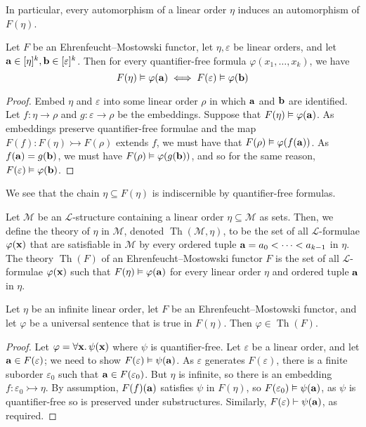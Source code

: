In particular, every automorphism of a linear order \( \eta \) induces an automorphism of \( F(\eta) \).
\begin{proposition}
	Let \( F \) be an Ehrenfeucht--Mostowski functor, let \( \eta, \varepsilon \) be linear orders, and let \( \vb a \in [\eta]^k, \vb b \in [\varepsilon]^k \).
	Then for every quantifier-free formula \( \varphi(x_1, \dots, x_k) \), we have
	\[ F(\eta) \vDash \varphi(\vb a) \iff F(\varepsilon) \vDash \varphi(\vb b) \]
\end{proposition}
\begin{proof}
	Embed \( \eta \) and \( \varepsilon \) into some linear order \( \rho \) in which \( \vb a \) and \( \vb b \) are identified.
	Let \( f : \eta \to \rho \) and \( g : \varepsilon \to \rho \) be the embeddings.
	Suppose that \( F(\eta) \vDash \varphi(\vb a) \).
	As embeddings preserve quantifier-free formulae and the map \( F(f) : F(\eta) \rightarrowtail F(\rho) \) extends \( f \), we must have that \( F(\rho) \vDash \varphi(f(\vb a)) \).
	As \( f(\vb a) = g(\vb b) \), we must have \( F(\rho) \vDash \varphi(g(\vb b)) \), and so for the same reason, \( F(\varepsilon) \vDash \varphi(\vb b) \).
\end{proof}
We see that the chain \( \eta \subseteq F(\eta) \) is indiscernible by quantifier-free formulas.
\begin{definition}
	Let \( \mathcal M \) be an \( \mathcal L \)-structure containing a linear order \( \eta \subseteq \mathcal M \) as sets.
	Then, we define the theory of \( \eta \) in \( \mathcal M \), denoted \( \operatorname{Th}(\mathcal M, \eta) \), to be the set of all \( \mathcal L \)-formulae \( \varphi(\vb x) \) that are satisfiable in \( \mathcal M \) by every ordered tuple \( \vb a = a_0 < \dots < a_{k-1} \) in \( \eta \).
	The theory \( \operatorname{Th}(F) \) of an Ehrenfeucht--Mostowski functor \( F \) is the set of all \( \mathcal L \)-formulae \( \varphi(\vb x) \) such that \( F(\eta) \vDash \varphi(\vb a) \) for every linear order \( \eta \) and ordered tuple \( \vb a \) in \( \eta \).
\end{definition}
\begin{lemma}
	Let \( \eta \) be an infinite linear order, let \( F \) be an Ehrenfeucht--Mostowski functor, and let \( \varphi \) be a universal sentence that is true in \( F(\eta) \).
	Then \( \varphi \in \operatorname{Th}(F) \).
\end{lemma}
\begin{proof}
	Let \( \varphi = \forall \vb x.\, \psi(\vb x) \) where \( \psi \) is quantifier-free.
	Let \( \varepsilon \) be a linear order, and let \( \vb a \in F(\varepsilon) \); we need to show \( F(\varepsilon) \vDash \psi(\vb a) \).
	As \( \varepsilon \) generates \( F(\varepsilon) \), there is a finite suborder \( \varepsilon_0 \) such that \( \vb a \in F(\varepsilon_0) \).
	But \( \eta \) is infinite, so there is an embedding \( f : \varepsilon_0 \rightarrowtail \eta \).
	By assumption, \( F(f)(\vb a) \) satisfies \( \psi \) in \( F(\eta) \), so \( F(\varepsilon_0) \vDash \psi(\vb a) \), as \( \psi \) is quantifier-free so is preserved under substructures.
	Similarly, \( F(\varepsilon) \vdash \psi(\vb a) \), as required.
\end{proof}
